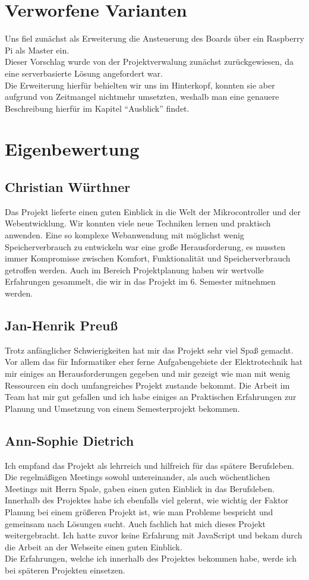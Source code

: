 \section{Verworfene Varianten}
Uns fiel zunächst als Erweiterung die Ansteuerung des Boards über ein Raspberry Pi als Master ein.\\
Dieser Vorschlag wurde von der Projektverwalung zunächst zurückgewiesen, da eine serverbasierte Lösung
angefordert war. \\ Die Erweiterung hierfür behielten wir uns im Hinterkopf, konnten sie aber aufgrund 
von Zeitmangel nichtmehr umsetzten, weshalb man eine genauere Beschreibung hierfür im Kapitel "`Ausblick"'
findet.
\section{Eigenbewertung}


\subsection*{Christian Würthner}
Das Projekt lieferte einen guten Einblick in die Welt der Mikrocontroller und
der Webentwicklung. Wir konnten viele neue Techniken lernen und praktisch
anwenden. Eine so komplexe Webanwendung mit möglichst wenig Speicherverbrauch zu
entwickeln war eine große Herausforderung, es mussten immer Kompromisse zwischen
Komfort, Funktionalität und Speicherverbrauch getroffen werden. Auch im Bereich
Projektplanung haben wir wertvolle Erfahrungen gesammelt, die wir in das Projekt
im 6. Semester mitnehmen werden.

\subsection*{Jan-Henrik Preuß}
Trotz anfänglicher Schwierigkeiten hat mir das Projekt sehr viel Spaß gemacht.
Vor allem das für Informatiker eher ferne Aufgabengebiete der Elektrotechnik hat
mir einiges an Herausforderungen gegeben und mir gezeigt wie man mit wenig
Ressourcen ein doch umfangreiches Projekt zustande bekommt. Die Arbeit im Team 
hat mir gut gefallen und ich habe einiges an Praktischen Erfahrungen zur Planung
und Umsetzung von einem Semesterprojekt bekommen.

\subsection*{Ann-Sophie Dietrich}
Ich empfand das Projekt als lehrreich und hilfreich für das spätere Berufsleben.\\
Die regelmäßigen Meetings sowohl untereinander, als auch 
wöchentlichen Meetings mit Herrn Spale, gaben einen guten Einblick in das Berufsleben.\\
Innerhalb des Projektes habe ich ebenfalls viel gelernt, wie wichtig der Faktor Planung 
bei einem größeren Projekt ist, wie man Probleme bespricht und gemeinsam nach Lösungen sucht.
Auch fachlich hat mich dieses Projekt weitergebracht. Ich hatte zuvor keine Erfahrung 
mit JavaScript und bekam durch die Arbeit an der Webseite einen guten Einblick.\\
Die Erfahrungen, welche ich innerhalb des Projektes bekommen habe, werde ich bei 
späteren Projekten einsetzen.

